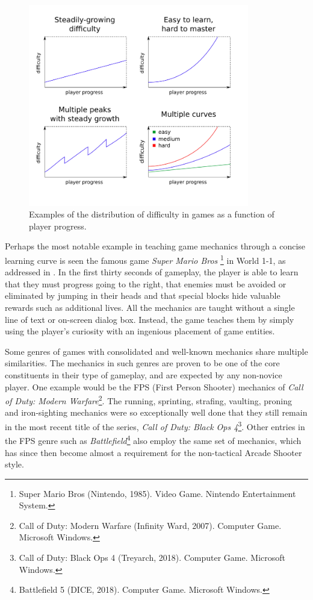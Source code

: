 \documentclass[cic,tc,english]{iiufrgs}
\begin{document}
\begin{figure}
    \caption{Examples of the distribution of difficulty in games as a function of player progress.}
    \begin{center}
        \includegraphics[width=26em]{figures/fig-difficulty-curves.png}
    \end{center}
    \label{fig:difficulty-curves}
\end{figure}

Perhaps the most notable example in teaching game mechanics through a concise learning curve is seen the famous game \emph{Super Mario Bros} \footnote{Super Mario Bros (Nintendo, 1985). Video Game. Nintendo Entertainment System.} in World 1-1, as addressed in \cite{video_extracreditsmario11}. In the first thirty seconds of gameplay, the player is able to learn that they must progress going to the right, that enemies must be avoided or eliminated by jumping in their heads and that special blocks hide valuable rewards such as additional lives. All the mechanics are taught without a single line of text or on-screen dialog box. Instead, the game teaches them by simply using the player's curiosity with an ingenious placement of game entities.

Some genres of games with consolidated and well-known mechanics share multiple similarities. The mechanics in such genres are proven to be one of the core constituents in their type of gameplay, and are expected by any non-novice player. One example would be the FPS (First Person Shooter) mechanics of \emph{Call of Duty: Modern Warfare}\footnote{Call of Duty: Modern Warfare (Infinity Ward, 2007). Computer Game. Microsoft Windows.}. The running, sprinting, strafing, vaulting, proning and iron-sighting mechanics were so exceptionally well done that they still remain in the most recent title of the series, \emph{Call of Duty: Black Ops 4}\footnote{Call of Duty: Black Ops 4 (Treyarch, 2018). Computer Game. Microsoft Windows.}. Other entries in the FPS genre such as \emph{Battlefield}\footnote{Battlefield 5 (DICE, 2018). Computer Game. Microsoft Windows.} also employ the same set of mechanics, which has since then become almost a requirement for the non-tactical Arcade Shooter style.
\end{document}
